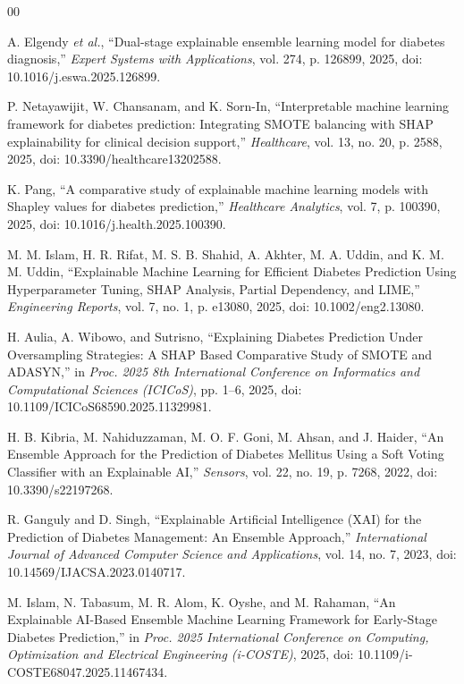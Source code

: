 \documentclass[conference]{IEEEtran}
\begin{document}
\begin{thebibliography}{00}

A. Elgendy \textit{et al.},
``Dual-stage explainable ensemble learning model for diabetes diagnosis,''
\textit{Expert Systems with Applications},
vol. 274,
p. 126899,
2025,
doi: 10.1016/j.eswa.2025.126899.

P. Netayawijit, W. Chansanam, and K. Sorn-In,
``Interpretable machine learning framework for diabetes prediction:
Integrating SMOTE balancing with SHAP explainability for clinical
decision support,''
\textit{Healthcare},
vol. 13,
no. 20,
p. 2588,
2025,
doi: 10.3390/healthcare13202588.

K. Pang,
``A comparative study of explainable machine learning models with
Shapley values for diabetes prediction,''
\textit{Healthcare Analytics},
vol. 7,
p. 100390,
2025,
doi: 10.1016/j.health.2025.100390.

M. M. Islam, H. R. Rifat, M. S. B. Shahid, A. Akhter,
M. A. Uddin, and K. M. M. Uddin,
``Explainable Machine Learning for Efficient Diabetes Prediction
Using Hyperparameter Tuning, SHAP Analysis, Partial Dependency,
and LIME,''
\textit{Engineering Reports},
vol. 7,
no. 1,
p. e13080,
2025,
doi: 10.1002/eng2.13080.

H. Aulia, A. Wibowo, and Sutrisno,
``Explaining Diabetes Prediction Under Oversampling Strategies:
A SHAP Based Comparative Study of SMOTE and ADASYN,''
in \textit{Proc. 2025 8th International Conference on Informatics
and Computational Sciences (ICICoS)},
pp. 1--6,
2025,
doi: 10.1109/ICICoS68590.2025.11329981.

H. B. Kibria, M. Nahiduzzaman, M. O. F. Goni, M. Ahsan,
and J. Haider,
``An Ensemble Approach for the Prediction of Diabetes Mellitus
Using a Soft Voting Classifier with an Explainable AI,''
\textit{Sensors},
vol. 22,
no. 19,
p. 7268,
2022,
doi: 10.3390/s22197268.

R. Ganguly and D. Singh,
``Explainable Artificial Intelligence (XAI) for the Prediction
of Diabetes Management: An Ensemble Approach,''
\textit{International Journal of Advanced Computer Science
and Applications},
vol. 14,
no. 7,
2023,
doi: 10.14569/IJACSA.2023.0140717.

M. Islam, N. Tabasum, M. R. Alom, K. Oyshe, and M. Rahaman,
``An Explainable AI-Based Ensemble Machine Learning Framework
for Early-Stage Diabetes Prediction,''
in \textit{Proc. 2025 International Conference on Computing,
Optimization and Electrical Engineering (i-COSTE)},
2025,
doi: 10.1109/i-COSTE68047.2025.11467434.


\end{thebibliography}
\end{document}
